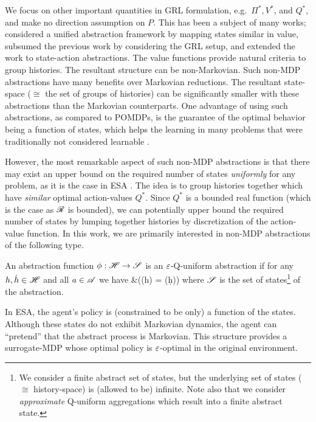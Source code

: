\documentclass{article} %
\let\defOrg\definition
\let\enddefOrg\enddefinition
\renewenvironment{definition}{\begin{tcolorbox}\defOrg}{\enddefOrg\end{tcolorbox}}
\begin{document}
We focus on other important quantities in GRL formulation, e.g.\ $\Pi^*, V^*$, and $Q^*$, and make no direction assumption on $P$. This has been a subject of many works; \cite{Li2006,Abel2016} considered a unified abstraction framework by mapping states similar in value, \citet{Hutter2016} subsumed the previous work by considering the GRL setup, and \citet{Majeed2019} extended the work to state-action abstractions. The value functions provide natural criteria to group histories. The resultant structure can be non-Markovian. Such non-MDP abstractions have many benefits over Markovian reductions. The resultant state-space ($\cong$ the set of groups of histories) can be significantly smaller with these abstractions than the Markovian counterparts. One advantage of using such abstractions, as compared to POMDPs, is the guarantee of the optimal behavior being a function of states, which helps the learning in many problems that were traditionally not considered learnable \cite{Majeed2018}.

However, the most remarkable aspect of such non-MDP abstractions is that there may exist an upper bound on the required number of states \emph{uniformly} for any problem, as it is the case in ESA \cite{Hutter2016}.
The idea is to group histories together which have \emph{similar} optimal action-values $Q^*$. Since $Q^*$ is a bounded real function (which is the case as $\R$ is bounded), we can potentially upper bound the required number of states by lumping together histories by discretization of the action-value function. In this work, we are primarily interested in non-MDP abstractions of the following type.

\begin{definition}[$\eps$-Q-uniform abstraction]
    An abstraction function $\phi: \H \to \S$ is an $\eps$-Q-uniform abstraction if for any $h, \d h \in \H$ and all $a \in \A$ we have
    \bqan
    &\left(\phi(h) = \phi(\d h)\right)\implies {} \leq \eps
    \eqan
    where $\S$ is the set of states\footnote{We consider a finite abstract set of states, but the underlying set of states ($\cong$ history-space) is (allowed to be) infinite. Note also that we consider \emph{approximate} Q-uniform aggregations which result into a finite abstract state.} of the abstraction.
\end{definition}

In ESA, the agent's policy is (constrained to be only) a function of the states. Although these states do not exhibit Markovian dynamics, the agent can ``pretend'' that the abstract process is Markovian. This structure provides a surrogate-MDP whose optimal policy is $\eps$-optimal in the original environment.
\end{document}
